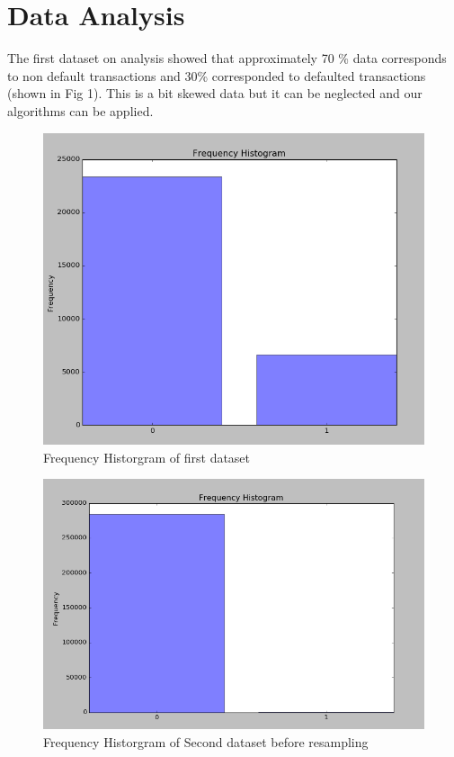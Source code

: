 \section{ Data Analysis}
	\par The first dataset on analysis showed that approximately 70 \% data corresponds to non default transactions and 30\% corresponded to defaulted transactions (shown in Fig 1). This is a bit skewed data but it can be neglected and our algorithms can be applied.\\
\begin{figure}
  \centering
  \includegraphics[scale=.4]{data1freq.png}
  \caption{Frequency Historgram of first dataset}
  
\end{figure}
\begin{figure}
  \centering
  \includegraphics[scale=.4]{freq2init.png}
  \caption{Frequency Historgram of Second dataset before resampling}
  
\end{figure}
